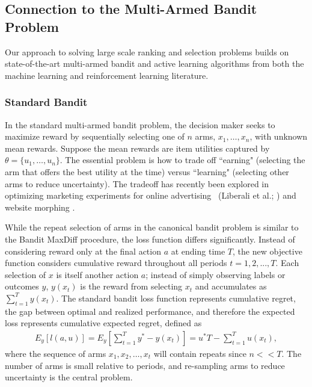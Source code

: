 \documentclass[nonblindrev]{informs3}
\begin{document}



\subsection{Connection to the Multi-Armed Bandit Problem}
Our approach to solving large scale ranking and selection problems builds on state-of-the-art multi-armed bandit and active learning algorithms from both the machine learning and reinforcement learning literature.

\subsubsection{Standard Bandit}

In the standard multi-armed bandit problem, the decision maker seeks to maximize reward by sequentially selecting one of $n$ arms, $x_1,\ldots,x_n$, with unknown mean rewards. Suppose the mean rewards are item utilities captured by $\theta = \{u_1, \ldots, u_n\}$. The essential problem is how to trade off ``earning" (selecting the arm that offers the best utility at the time) versus ``learning" (selecting other arms to reduce uncertainty). The tradeoff has recently been explored in optimizing marketing experiments for online advertising ~(Liberali et al.; \cite{schwartzetal2017,urban2013morphing}) and website morphing \citep{hauser2009website}. 

While the repeat selection of arms in the canonical bandit problem is similar to the Bandit MaxDiff procedure, the loss function differs significantly. Instead of considering reward only at the final action $a$ at ending time $T$, the new objective function considers cumulative reward throughout all periods $t=1,2,...,T$. Each selection of $x$ is itself another action $a$; instead of simply observing labels or outcomes $y$, $y(x_t)$ is the reward from selecting $x_t$ and accumulates as $\sum_{t=1}^{T} y(x_t)$. The standard bandit loss function represents cumulative regret, the gap between optimal and realized performance, and therefore the expected loss represents cumulative expected regret, defined as
\begin{align}
E_y[ l(a,u) ] = E_y[ \sum_{t=1}^{T} y^{*} - y(x_t) ] 
= u^{*}T - \sum_{t=1}^{T} u(x_t), 
\end{align}
where the sequence of arms $x_1,x_2,\ldots,x_t$ will contain repeats since $n << T$. The number of arms is small relative to periods, and re-sampling arms to reduce uncertainty is the central problem. 
\end{document}
